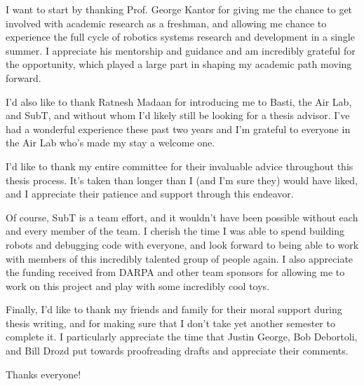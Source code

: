 \documentclass[12pt]{cmuthesis}
\begin{document}
\begin{acknowledgments}
	I want to start by thanking Prof. George Kantor for giving me the chance to get involved with academic research as a freshman, and allowing me chance to experience the full cycle of robotics systems research and development in a single summer. I appreciate his mentorship and guidance and am incredibly grateful for the opportunity, which played a large part in shaping my academic path moving forward. 
	
	I'd also like to thank Ratnesh Madaan for introducing me to Basti, the Air Lab, and SubT, and without whom I'd likely still be looking for a thesis advisor. I've had a wonderful experience these past two years and I'm grateful to everyone in the Air Lab who's made my stay a welcome one.
	
	I'd like to thank my entire committee for their invaluable advice throughout this thesis process. It's taken than longer than I (and I'm sure they) would have liked, and I appreciate their patience and support through this endeavor.
	
	Of course, SubT is a team effort, and it wouldn't have been possible without each and every member of the team. I cherish the time I was able to spend building robots and debugging code with everyone, and look forward to being able to work with members of this incredibly talented group of people again. I also appreciate the funding received from DARPA and other team sponsors for allowing me to work on this project and play with some incredibly cool toys.
	
	Finally, I'd like to thank my friends and family for their moral support during thesis writing, and for making sure  that I don't take yet another semester to complete it. I particularly appreciate the time that Justin George, Bob Debortoli, and Bill Drozd put towards proofreading drafts and appreciate their comments.
	\newline
\begin{center}
Thanks everyone!
\end{center}

	
\end{acknowledgments}

\tableofcontents
\listoffigures
\listoftables

\mainmatter


%
%
%
%
%
\end{document}
